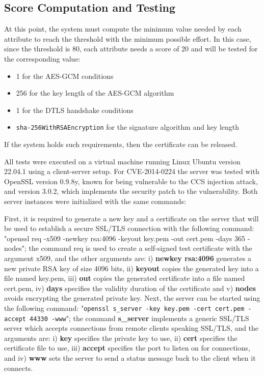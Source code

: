 \subsection{Score Computation and Testing}
At this point, the system must compute the minimum value needed by each attribute to reach the threshold with the minimum possible effort. In this case, since the threshold is 80, each attribute needs a score of 20 and will be tested for the corresponding value:
\begin{itemize}
    \item 1 for the AES-GCM conditions
    \item 256 for the key length of the AES-GCM algorithm
    \item 1 for the DTLS handshake conditions
    \item \texttt{sha-256WithRSAEncryption} for the signature algorithm and key length
\end{itemize}

If the system holds such requirements, then the certificate can be released.

All tests were executed on a virtual machine running Linux Ubuntu version 22.04.1 using a client-server setup.
For CVE-2014-0224 the server was tested with OpenSSL version 0.9.8y, known for being vulnerable to the CCS injection attack, and version 3.0.2, which implements the security patch to the vulnerability. Both server instances were initialized with the same commands:

First, it is required to generate a new key and a certificate on the server that will be used to establish a secure SSL/TLS connection with the following command:
"openssl req -x509 -newkey rsa:4096 -keyout key.pem -out cert.pem -days 365 -nodes"; the command req is used to create a self-signed test certificate with the argument x509, and the other arguments are: i) \textbf{newkey rsa:4096} generates a new private RSA key of size 4096 bits, ii) \textbf{keyout} copies the generated key into a file named key.pem, iii) \textbf{out} copies the generated certificate into a file named cert.pem, iv) \textbf{days} specifies the validity duration of the certificate and v) \textbf{nodes} avoids encrypting the generated private key.
Next, the server can be started using the following command:
"\texttt{openssl s\_server -key key.pem -cert cert.pem -accept 44330 -www}"; the command \textbf{s\_server} implements a generic SSL/TLS server which accepts connections from remote clients speaking SSL/TLS, and the arguments are: i) \textbf{key} specifies the private key to use, ii) \textbf{cert} specifies the certificate file to use, iii) \textbf{accept} specifies the port to listen on for connections, and iv) \textbf{www} sets the server to send a status message back to the client when it connects.

